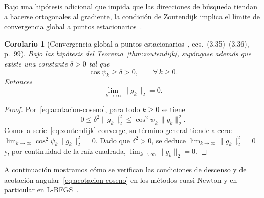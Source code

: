 \documentclass[a4paper,openany,oneside,10pt]{report}
\theoremstyle{pnlTeorema}
\newtheorem{corolario}{Corolario}[section]
\theoremstyle{pnlDefinicion}
\theoremstyle{pnlObservacion}
\begin{document}
Bajo una hipótesis adicional que impida que las direcciones de búsqueda tiendan
a hacerse ortogonales al gradiente, la condición de Zoutendijk implica el límite
de convergencia global a puntos estacionarios~\cite[ecs.~(3.35)--(3.36), p.~99]{andrei2020}.

\begin{corolario}[Convergencia global a puntos estacionarios~\cite{andrei2020}, ecs.~(3.35)--(3.36), p.~99]
\label{cor:convergencia-global-limite}
Bajo las hipótesis del Teorema~\ref{thm:zoutendijk}, supóngase además que existe
una constante $\delta>0$ tal que
\begin{equation}\label{eq:acotacion-coseno}
\cos\psi_k \ge \delta > 0, \qquad \forall\,k\ge 0.
\end{equation}
Entonces
\begin{equation}\label{eq:limite-gradiente-cero}
\lim_{k\to\infty}\|g_k\|_2 = 0.
\end{equation}
\end{corolario}

\begin{proof}
Por~\eqref{eq:acotacion-coseno}, para todo $k\ge 0$ se tiene
\[
0 \le \delta^2\|g_k\|_2^2 \le \cos^2\psi_k\,\|g_k\|_2^2.
\]
Como la serie~\eqref{eq:zoutendijk} converge, su término general tiende a cero:
$\lim_{k\to\infty}\cos^2\psi_k\|g_k\|_2^2=0$. Dado que $\delta^2>0$, se deduce
$\lim_{k\to\infty}\|g_k\|_2^2=0$ y, por continuidad de la raíz cuadrada,
$\lim_{k\to\infty}\|g_k\|_2=0$.
\end{proof}

A continuación mostramos cómo se verifican las condiciones de descenso y de
acotación angular~\eqref{eq:acotacion-coseno} en los métodos cuasi-Newton y en
particular en L-BFGS~\cite[Sección~1.4.6, pp.~38--39 y Sección~3.3, ítem~2, pp.~99--100]{andrei2020}.
\end{document}
